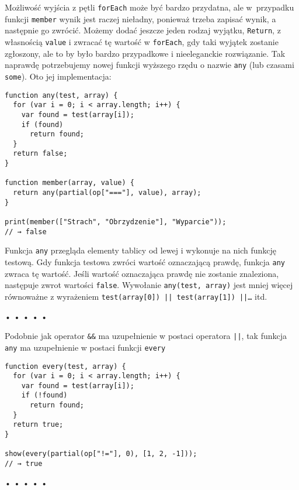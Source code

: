   
Możliwość wyjścia z pętli \texttt{forEach} może być bardzo przydatna, ale w~przypadku funkcji \texttt{member} wynik jest raczej nieładny, ponieważ trzeba zapisać wynik, a następnie go zwrócić. Możemy dodać jeszcze jeden rodzaj wyjątku, \texttt{Return}, z własnością \texttt{value} i zwracać tę wartość w \texttt{forEach}, gdy taki wyjątek zostanie zgłoszony, ale to by było bardzo przypadkowe i nieeleganckie rozwiązanie. Tak naprawdę potrzebujemy nowej funkcji wyższego rzędu o nazwie \texttt{any} (lub czasami \texttt{some}). Oto jej implementacja:

  
\begin{verbatim} 
function any(test, array) {
  for (var i = 0; i < array.length; i++) {
    var found = test(array[i]);
    if (found)
      return found;
  }
  return false;
}

function member(array, value) {
  return any(partial(op["==="], value), array);
}

print(member(["Strach", "Obrzydzenie"], "Wyparcie"));
// → false
\end{verbatim}
  
Funkcja \texttt{any} przegląda elementy tablicy od lewej i wykonuje na nich funkcję testową. Gdy funkcja testowa zwróci wartość oznaczającą prawdę, funkcja \texttt{any} zwraca tę wartość. Jeśli wartość oznaczająca prawdę nie zostanie znaleziona, następuje zwrot wartości \texttt{false}. Wywołanie \texttt{any(test, array)} jest mniej więcej równoważne z wyrażeniem \texttt{test(array[0]) || test(array[1]) ||…} itd.



\begin{center}
• • • • •
\end{center}

  
Podobnie jak operator \texttt{\&\&} ma uzupełnienie w postaci operatora \texttt{||}, tak funkcja \texttt{any} ma uzupełnienie w postaci funkcji \texttt{every}

  
\begin{verbatim} 
function every(test, array) {
  for (var i = 0; i < array.length; i++) {
    var found = test(array[i]);
    if (!found)
      return found;
  }
  return true;
}

show(every(partial(op["!="], 0), [1, 2, -1]));
// → true
\end{verbatim}


\begin{center}
• • • • •
\end{center}

